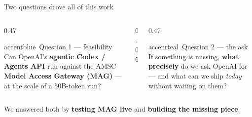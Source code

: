 \begin{frame}{Two questions drove all of this work}
  \begin{columns}[t, totalwidth=\textwidth]
    \begin{column}{0.47\textwidth}
      \begin{featbox}{accentblue}{\faQuestionCircle\ Question 1 --- feasibility}
        \small Can OpenAI's \textbf{agentic Codex / Agents API} run against the
        AMSC \textbf{Model Access Gateway (MAG)} --- at the scale of a
        50B-token run?
      \end{featbox}
    \end{column}
    \begin{column}{0.06\textwidth}\end{column}
    \begin{column}{0.47\textwidth}
      \begin{featbox}{accentteal}{\faBullhorn\ Question 2 --- the ask}
        \small If something is missing, \textbf{what precisely} do we ask
        OpenAI for --- and what can we ship \emph{today} without waiting on
        them?
      \end{featbox}
    \end{column}
  \end{columns}
  \vspace{12pt}
  \begin{center}
    {\color{midgray} We answered both by \textbf{testing MAG live} and
    \textbf{building the missing piece}.}
  \end{center}
\end{frame}

